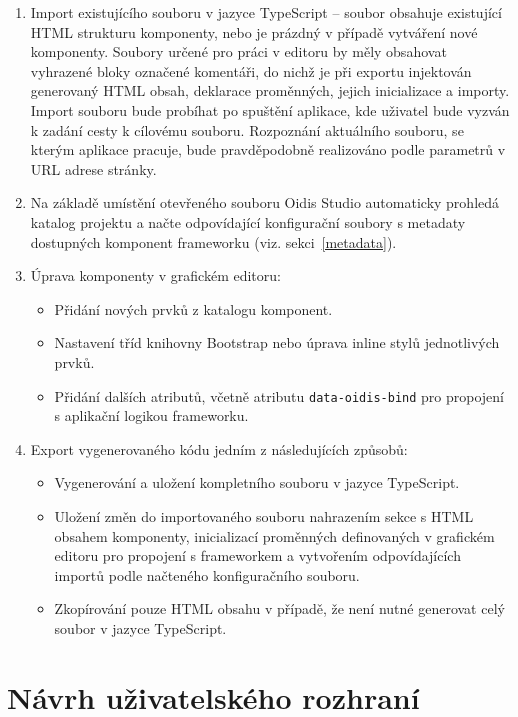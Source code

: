 \begin{enumerate}
    \item {Import existujícího souboru v jazyce TypeScript -- soubor obsahuje existující HTML strukturu komponenty, nebo je prázdný v případě vytváření nové komponenty. Soubory určené pro práci v editoru by měly obsahovat vyhrazené bloky označené komentáři, do nichž je při exportu injektován generovaný HTML obsah, deklarace proměnných, jejich inicializace a importy. Import souboru bude probíhat po spuštění aplikace, kde uživatel bude vyzván k zadání cesty k cílovému souboru. Rozpoznání aktuálního souboru, se kterým aplikace pracuje, bude pravděpodobně realizováno podle parametrů v URL adrese stránky.}
    \item {Na základě umístění otevřeného souboru Oidis Studio automaticky prohledá katalog projektu a načte odpovídající konfigurační soubory s metadaty dostupných komponent frameworku (viz. sekci~\ref{metadata}).}
    \item {Úprava komponenty v grafickém editoru:
    \begin{itemize}
        \item {Přidání nových prvků z katalogu komponent.}
        \item {Nastavení tříd knihovny Bootstrap nebo úprava inline stylů jednotlivých prvků.}
        \item {Přidání dalších atributů, včetně atributu \texttt{data-oidis-bind} pro propojení s aplikační logikou frameworku.}
    \end{itemize}}
    \item {Export vygenerovaného kódu jedním z následujících způsobů:
        \begin{itemize}
            \item {Vygenerování a uložení kompletního souboru v jazyce TypeScript.}
            \item {Uložení změn do importovaného souboru nahrazením sekce s HTML obsahem komponenty, inicializací proměnných definovaných v grafickém editoru pro propojení s frameworkem a vytvořením odpovídajících importů podle načteného konfiguračního souboru.}
            \item {Zkopírování pouze HTML obsahu v případě, že není nutné generovat celý soubor v jazyce TypeScript.}
        \end{itemize}
    }
\end{enumerate}

\section{Návrh uživatelského rozhraní}

